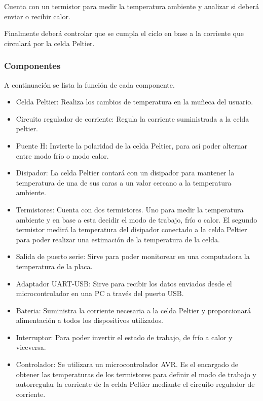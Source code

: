 \documentclass[10pt,spanish,a4paper,openany,notitlepage]{article}
\begin{document}
Cuenta con un termistor para medir la temperatura ambiente
y analizar si deberá enviar o recibir calor.

Finalmente deberá controlar que se cumpla el ciclo en base a la corriente
que circulará por la celda Peltier.

\subsubsection{Componentes}

A continuación se lista la función de cada componente.

\begin{itemize}
\item{Celda Peltier:} Realiza los cambios de temperatura en la muñeca del usuario.
\item{Circuito regulador de corriente:} Regula la corriente suministrada
a la celda peltier.
\item{Puente H:} Invierte la polaridad de la celda Peltier, para así poder
alternar entre modo frío o modo calor.
\item{Disipador:} La celda Peltier contará con un disipador para mantener
la temperatura de una de sus caras a un valor cercano a la temperatura
ambiente.
\item{Termistores:} Cuenta con dos termistores. Uno para medir la
temperatura ambiente y en base a esta decidir el modo de trabajo, frío
o calor. El segundo termistor medirá la temperatura del disipador conectado
a la celda Peltier para poder realizar una estimación de la temperatura
de la celda.
\item{Salida de puerto serie:} Sirve para poder monitorear en una 
computadora la temperatura de la placa.
\item{Adaptador UART-USB:} Sirve para recibir los datos enviados desde
el microcontrolador en una PC a través del puerto USB.
\item{Bateria:} Suministra la corriente necesaria a la celda Peltier y 
 proporcionará alimentación a todos los dispositivos utilizados.
\item{Interruptor:} Para poder invertir el estado de trabajo, de frío a calor 
y viceversa.
\item{Controlador:} Se utilizara un microcontrolador AVR. Es
el encargado de obtener las temperaturas de los termistores para definir
el modo de trabajo y autorregular la corriente de la celda Peltier mediante
el circuito regulador de corriente.
\end{itemize}
\end{document}
